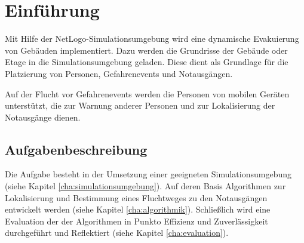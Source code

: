 \chapter{Einf\"uhrung}
\setcounter{page}{1}

Mit Hilfe der NetLogo-Simulationsumgebung \cite{Netlogo.1999} wird eine dynamische Evakuierung von Gebäuden implementiert. Dazu werden die Grundrisse der Gebäude oder Etage in die Simulationsumgebung geladen. Diese dient als Grundlage für die Platzierung von Personen, Gefahrenevents und Notausgängen. 

Auf der Flucht vor Gefahrenevents werden die Personen von mobilen Geräten unterstützt, die zur Warnung anderer Personen und zur Lokalisierung der Notausgänge dienen.


%



\section{Aufgabenbeschreibung}

Die Aufgabe besteht in der Umsetzung einer geeigneten Simulationsumgebung (siehe Kapitel \ref{cha:simulationsumgebung}). Auf deren Basis Algorithmen zur Lokalisierung und Bestimmung eines Fluchtweges zu den Notausgängen entwickelt werden (siehe Kapitel \ref{cha:algorithmik}). Schließlich wird eine Evaluation der der Algorithmen in Punkto Effizienz und Zuverlässigkeit durchgeführt und Reflektiert (siehe Kapitel \ref{cha:evaluation}).

